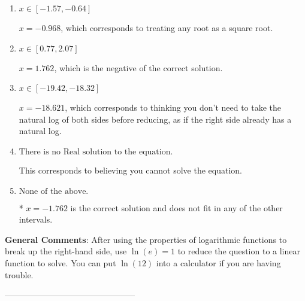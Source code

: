 \documentclass{article}[14pt]
\begin{document}
\begin{enumerate}[label=\Alph*.] 
\item $ x \in [-1.57, -0.64] $ 

 $x = -0.968$, which corresponds to treating any root as a square root. 
\item $ x \in [0.77, 2.07] $ 

 $x = 1.762$, which is the negative of the correct solution. 
\item $ x \in [-19.42, -18.32] $ 

 $x = -18.621$, which corresponds to thinking you don't need to take the natural log of both sides before reducing, as if the right side already has a natural log. 
\item $ \text{There is no Real solution to the equation.} $ 

 This corresponds to believing you cannot solve the equation. 
\item $ \text{None of the above.} $ 

 * $x = -1.762$ is the correct solution and does not fit in any of the other intervals. 
\end{enumerate} 
 
\textbf{General Comments}: After using the properties of logarithmic functions to break up the right-hand side, use $\ln(e) = 1$ to reduce the question to a linear function to solve. You can put $\ln(12)$ into a calculator if you are having trouble.

-----------------------------------------------
\end{document}
